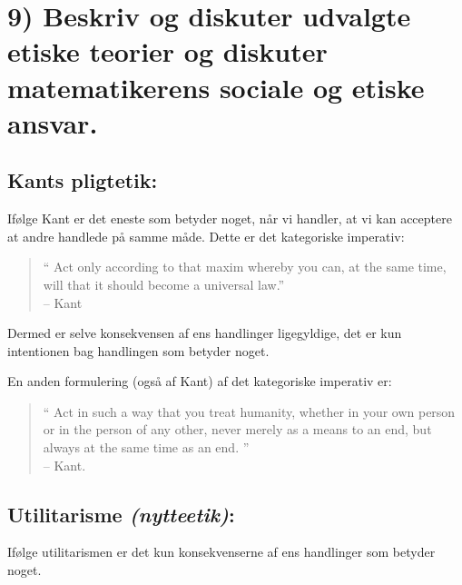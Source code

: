 \documentclass[a4paper,oneside,12pt]{memoir}
\begin{document}
\newpage

\section{9) Beskriv og diskuter udvalgte etiske teorier og diskuter matematikerens sociale og etiske ansvar.}

\subsection{Kants pligtetik:}
Ifølge Kant er det eneste som betyder noget, når vi handler, at vi kan acceptere at andre handlede på samme måde. Dette er det kategoriske imperativ:
\begin{quote}
`` Act only according to that maxim whereby you can, at the same time, will that it should become a universal law.''\\-- Kant
\end{quote}
Dermed er selve konsekvensen af ens handlinger ligegyldige, det er kun intentionen bag handlingen som betyder noget.

En anden formulering (også af Kant) af det kategoriske imperativ er:

\begin{quote}
`` Act in such a way that you treat humanity, whether in your own person or in the person of any other, never merely as a means to an end, but always at the same time as an end. '' \\ -- Kant.
\end{quote}


\subsection{Utilitarisme \textit{(nytteetik)}:}
Ifølge utilitarismen er det kun konsekvenserne af ens handlinger som betyder noget.
\end{document}
